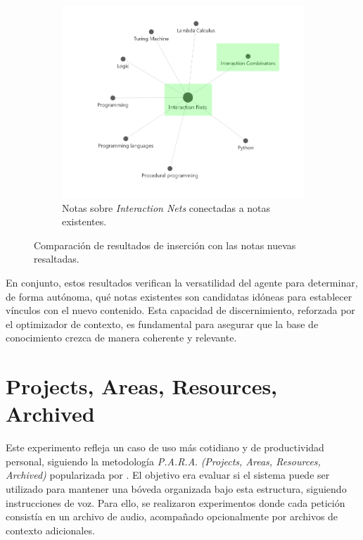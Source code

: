 \begin{figure}[h!]
\begin{subfigure}[b]{0.5\textwidth}
        \includegraphics[width=\textwidth]{figures/IntNetsPart.png}
        \caption{Notas sobre \textit{Interaction Nets} conectadas a notas existentes.}
        \label{fig:wiki_connected}
    \end{subfigure}
    \caption{Comparación de resultados de inserción con las notas nuevas resaltadas.}
    \label{fig:wiki_comparison}
\end{figure}

En conjunto, estos resultados verifican la versatilidad del agente para determinar, de forma autónoma, qué notas existentes son candidatas idóneas para establecer vínculos con el nuevo contenido. Esta capacidad de discernimiento, reforzada por el optimizador de contexto, es fundamental para asegurar que la base de conocimiento crezca de manera coherente y relevante.

\section{Projects, Areas, Resources, Archived}
Este experimento refleja un caso de uso más cotidiano y de productividad personal, siguiendo la metodología \textit{P.A.R.A}. \textit{(Projects, Areas, Resources, Archived)} popularizada por \cite{forteBuildingSecondBrain2022}. El objetivo era evaluar si el sistema puede ser utilizado para mantener una bóveda organizada bajo esta estructura, siguiendo instrucciones de voz. Para ello, se realizaron experimentos donde cada petición consistía en un archivo de audio, acompañado opcionalmente por archivos de contexto adicionales.

